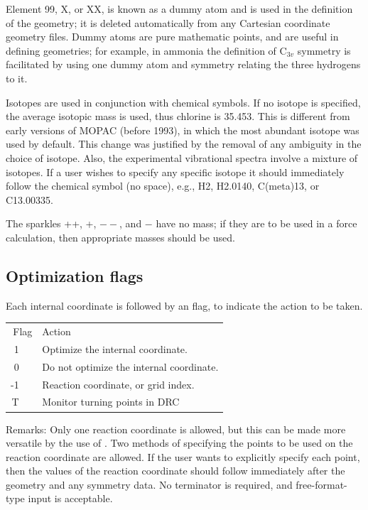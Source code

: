 Element 99, X, or XX, is known as a dummy atom and is  used  in  the
definition  of  the  geometry;  it  is  deleted  automatically  from  any
Cartesian coordinate geometry files.  Dummy  atoms  are  pure  mathematic
points,  and  are  useful in defining geometries; for example, in ammonia
the definition of C$_{3v}$ symmetry is facilitated by using one dummy atom and
symmetry relating the three hydrogens to it.


\label{atom_mass}
 Isotopes are used in  conjunction  with  chemical
symbols.   If  no isotope is specified, the average isotopic mass is used, thus
chlorine is 35.453.  This is different from  early versions of MOPAC (before
1993),  in  which the most abundant isotope was used by default.  This change
was justified by the removal of any ambiguity in the  choice  of  isotope.
Also,  the experimental  vibrational  spectra  involve  a mixture of isotopes.
If a user wishes to specify any specific isotope it should immediately  follow
the  chemical  symbol  (no  space),  e.g.,  H2, H2.0140, C(meta)13,  or
C13.00335.

The sparkles ++, +, $--$, and $-$ have no mass; if they are to  be  used in a
force calculation, then appropriate masses should be used.

\subsection{Optimization flags}
Each internal coordinate is followed by an flag, to indicate  the
action to be taken.

\begin{center}
\begin{tabular}{rl}
       Flag      &        Action  \\
        1  \ \      &       Optimize the internal coordinate.  \\
        0  \ \      &       Do not optimize the internal coordinate.  \\
       -1  \ \      &       Reaction coordinate, or grid index. \\
        T  \ \      &       Monitor turning points in DRC
\end{tabular}
\end{center}


 Remarks: Only one reaction coordinate
is allowed, but this can be made more versatile  by the use of .
Two methods of specifying the points to be used on the reaction coordinate are
allowed.   If the user wants to explicitly specify each point, then the values
of the reaction coordinate should  follow  immediately  after  the geometry
and  any  symmetry  data.   No  terminator  is  required,  and free-format-type
input is acceptable.

